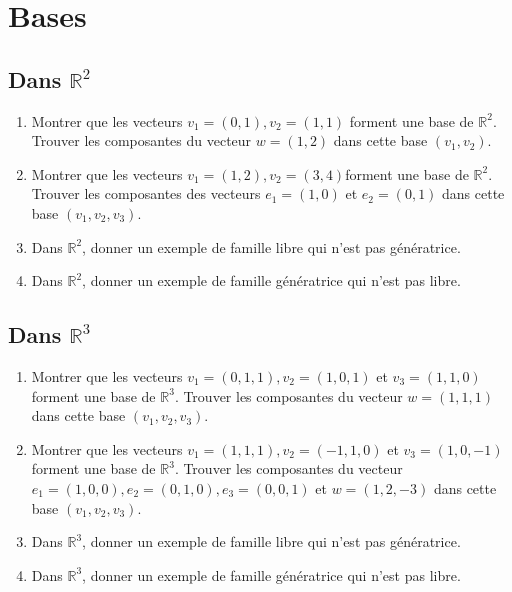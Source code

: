 \section*{Bases}
\vspace{2em}

\subsection{Dans $\mathbb{R}^2$}
\begin{enumerate}
\item  Montrer que les vecteurs $v_1=(0,1), v_2=(1,1)$ forment une base de $\mathbb{R}^2$. Trouver les composantes du vecteur $w=(1,2)$ dans cette base $\left(v_1, v_2\right)$.
\item Montrer que les vecteurs $v_1=(1,2), v_2=(3,4)$forment une base de $\mathbb{R}^2$. Trouver les composantes des vecteurs $e_1=(1,0)$ et $e_2=(0,1)$ dans cette base $\left(v_1, v_2, v_3\right)$.
\item Dans $\mathbb{R}^2$, donner un exemple de famille libre qui n'est pas génératrice.
\item Dans $\mathbb{R}^2$, donner un exemple de famille génératrice qui n'est pas libre.
\end{enumerate}

\vspace{2em}

\subsection{Dans $\mathbb{R}^3$}
\begin{enumerate}
\item  Montrer que les vecteurs $v_1=(0,1,1), v_2=(1,0,1)$ et $v_3=(1,1,0)$ forment une base de $\mathbb{R}^3$. \newline
 Trouver les composantes du vecteur $w=(1,1,1)$ dans cette base $\left(v_1, v_2, v_3\right)$.
\item Montrer que les vecteurs $v_1=(1,1,1), v_2=(-1,1,0)$ et $v_3=(1,0,-1)$ forment une base de $\mathbb{R}^3$. \newline 
Trouver les composantes du vecteur $e_1=(1,0,0), e_2=(0,1,0), e_3=(0,0,1)$ et $w=(1,2,-3)$ dans cette base $\left(v_1, v_2, v_3\right)$.
\item Dans $\mathbb{R}^3$, donner un exemple de famille libre qui n'est pas génératrice.
\item Dans $\mathbb{R}^3$, donner un exemple de famille génératrice qui n'est pas libre.
\end{enumerate}

